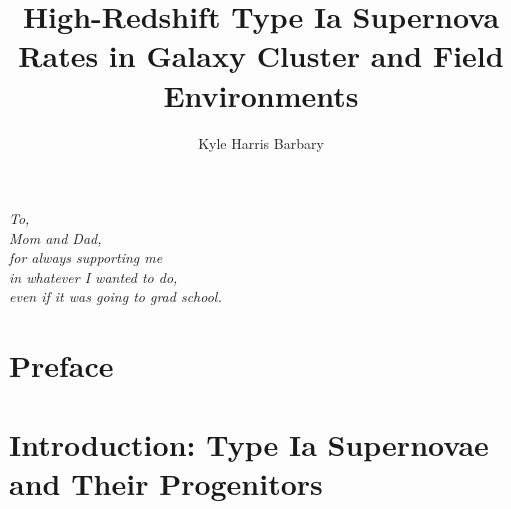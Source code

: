 \documentclass[12pt]{ucthesis}
\def\ssp{\def\baselinestretch{1}\large\normalsize}\ssp %
\begin{document}
\title{High-Redshift Type Ia Supernova Rates in Galaxy 
Cluster and Field Environments}
\author{Kyle Harris Barbary}




\maketitle
\copyrightpage

\begin{abstract}
\ssp

\end{abstract}

\begin{frontmatter}

\begin{dedication}
\null\vfil
{\large\raggedleft\it
To,\\ \vspace{12pt}
Mom and Dad,\\ \vspace{12pt}
for always supporting me\\
in whatever I wanted to do,\\
even if it was going to grad school.\\
}
\vfil\null
\end{dedication}

\begin{acknowledgements}

\end{acknowledgements}

\chapter*{Preface}


\tableofcontents
\listoffigures
\listoftables

\end{frontmatter}

\chapter{Introduction: Type Ia Supernovae and Their Progenitors} 
\label{sec:intro}

\end{document}
